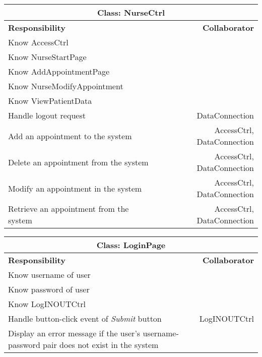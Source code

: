 \documentclass[12pt]{article}
\begin{document}
\begin{center}
\begin{tabularx}{\textwidth}{|X|r|} \hline
\multicolumn{2}{|c|}{\textbf{Class: NurseCtrl}}\\ \hline
\textbf{Responsibility} & \textbf{Collaborator} \\ \hline
Know AccessCtrl                             &                                  \\ \hline 
Know NurseStartPage                  &                             \\ \hline
Know AddAppointmentPage                            &                                 \\ \hline
Know NurseModifyAppointment                                   &                                 \\ \hline
Know ViewPatientData                                   &                                 \\ \hline
Handle logout request                                 &  DataConnection                                 \\ \hline
Add an appointment to the system & AccessCtrl, DataConnection \\ \hline
Delete an appointment from the system & AccessCtrl, DataConnection\\ \hline
Modify an appointment in the system & AccessCtrl, DataConnection\\ \hline
Retrieve an appointment from the system & AccessCtrl, DataConnection\\ \hline
\end{tabularx}
\newline\newline
\end{center}

\begin{center}
\begin{tabularx}{\textwidth}{|X|r|} \hline
\multicolumn{2}{|c|}{\textbf{Class: LoginPage}}\\ \hline
\textbf{Responsibility} & \textbf{Collaborator} \\ \hline
 Know username of user& \\ \hline
Know password of user& \\ \hline
Know LogINOUTCtrl & \\ \hline
Handle button-click event of \emph{Submit} button & LogINOUTCtrl \\ \hline
Display an error message if the user's username-password pair does not exist in the system &  \\ \hline
\end{tabularx}
\newline\newline
\end{center}
\end{document}
